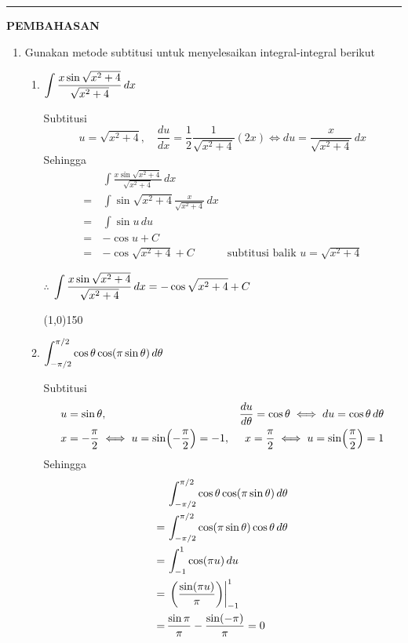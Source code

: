 \vspace{0.2cm}
\hrule height 1pt
\vspace{0.5cm}
\begin{center}
    \textbf{\large{PEMBAHASAN}}
\end{center}
\begin{enumerate}[leftmargin=*, label={\arabic*}.]
\item Gunakan metode subtitusi untuk menyelesaikan integral-integral berikut
\begin{enumerate}[label={\alph*}.]
    \item $\displaystyle\int \frac{x\sin\sqrt{x^{2}+4}}{\sqrt{x^{2}+4}}\, dx$
    
    Subtitusi
    \[
        u = \sqrt{x^{2}+4},\quad\frac{du}{dx} = \frac{1}{2}\frac{1}{\sqrt{x^{2}+4}}(2x) 
        \iff du = \frac{x}{\sqrt{x^{2}+4}}\,dx
    \]
    Sehingga 
    \begin{align*}
        &\int \frac{x\sin\sqrt{x^{2}+4}}{\sqrt{x^{2}+4}}\, dx \\
        =\,& \int \sin\sqrt{x^{2}+4}\frac{x}{\sqrt{x^{2}+4}}\, dx\\
        =\,& \int \sin u\, du\\
        =\,&-\cos u + C\\
        =\,&-\cos\sqrt{x^{2}+4} + C &\text{subtitusi balik }u = \sqrt{x^{2}+4}
    \end{align*}

    $\therefore$ 
    $\displaystyle\int \frac{x\sin\sqrt{x^{2}+4}}{\sqrt{x^{2}+4}}\, dx = -\cos\sqrt{x^{2}+4} + C$
\begin{center}
    \line(1,0){150}
\end{center}
    \item $\ds\int_{-\pi/2}^{\pi/2} \cos\theta\cos\brk*{\pi\sin\theta}\,d\theta$
    
    Subtitusi
    \begin{align*}
        &u = \sin\theta,&\frac{du}{d\theta} = \cos\theta \iff du = \cos\theta\,d\theta\\
        &x=-\frac{\pi}{2} \iff u = \sin\brk*{-\frac{\pi}{2}} = -1,
        &x=\frac{\pi}{2} \iff u = \sin \brk*{\frac{\pi}{2}} = 1
    \end{align*}
    Sehingga 
    \begin{align*}
        &\int_{-\pi/2}^{\pi/2} \cos\theta\cos\brk*{\pi\sin\theta}\,d\theta\\
        =\,& \int_{-\pi/2}^{\pi/2} \cos\brk*{\pi\sin\theta}\cos\theta\,d\theta\\
        =\,& \int_{-1}^{1} \cos(\pi u)\, du\\
        =\,& \eval{\frac{\sin(\pi u)}{\pi}}{-1}{1}\\
        =\,& \frac{\sin\pi}{\pi}-\frac{\sin(-\pi)}{\pi} = 0
    \end{align*}


\end{enumerate}
\end{enumerate}
